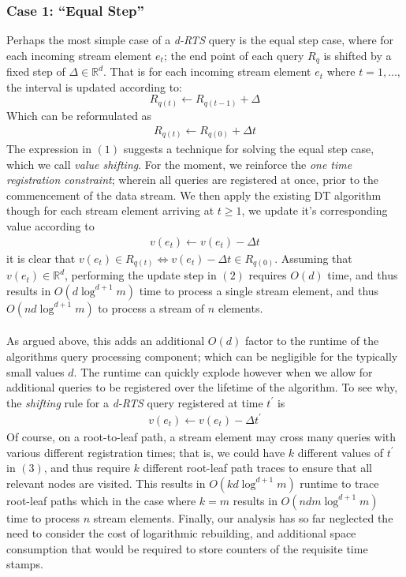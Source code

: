 \documentclass{article}
\begin{document}
\subsubsection*{Case 1: ``Equal Step''}
Perhaps the most simple case of a \textit{d-RTS} query is the equal step case, where for each incoming stream element $e_t$; the end point of each query $R_q$ is shifted by a fixed step of $\Delta\in\mathbb{R}^d$. That is for each incoming stream element $e_t$ where $t = 1,\dots,$ the interval is updated according to: 
$$R_{q(t)} \leftarrow R_{q(t-1)} + \Delta$$
Which can be reformulated as 
\begin{align}
    R_{q(t)} \leftarrow R_{q(0)} + \Delta t
\end{align}
The expression in $(1)$ suggests a technique for solving the equal step case, which we call \textit{value shifting}. For the moment, we reinforce the \textit{one time registration constraint}; wherein all queries are registered at once, prior to the commencement of the data stream. We then apply the existing DT algorithm though for each stream element arriving at $t\geq1$, we update it's corresponding value according to 
\begin{align}
    v(e_t) \leftarrow v(e_t) - \Delta t
\end{align}
it is clear that $v(e_t) \in R_{q(t)} \iff v(e_t)-\Delta t \in R_{q(0)}$. Assuming that $v(e_t)\in\mathbb{R}^d$, performing the update step in $(2)$ requires $O(d)$ time, and thus results in $O(d\log^{d+1}m)$ time to process a single stream element, and thus $O(nd\log^{d+1}m)$ to process a stream of $n$ elements. \\
\\
As argued above, this adds an additional $O(d)$ factor to the runtime of the algorithms query processing component; which can be negligible for the typically small values $d$. The runtime can quickly explode however when we allow for additional queries to be registered over the lifetime of the algorithm. To see why, the \textit{shifting} rule for a \textit{d-RTS} query registered at time $t^\prime$ is
\begin{align}
    v(e_t) \leftarrow v(e_t) - \Delta t^\prime
\end{align}
Of course, on a root-to-leaf path, a stream element may cross many queries with various different registration times; that is, we could have $k$ different values of $t^\prime$ in $(3)$, and thus require $k$ different root-leaf path traces to ensure that all relevant nodes are visited. This results in $O(kd\log^{d+1}m)$ runtime to trace root-leaf paths which in the case where $k=m$ results in $O(ndm\log^{d+1}m)$ time to process $n$ stream elements. Finally, our analysis has so far neglected the need to consider the cost of logarithmic rebuilding, and additional space consumption that would be required to store counters of the requisite time stamps.\\
\end{document}
